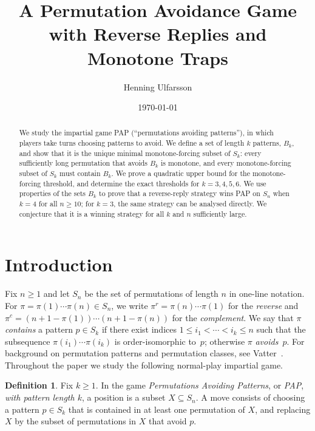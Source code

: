 \documentclass[11pt]{amsart}
\title[Permutation Avoidance Game]{A Permutation Avoidance Game with Reverse Replies and Monotone Traps}
\author{Henning Ulfarsson}
\date{\today}
\newcommand{\Sym}{S}
\theoremstyle{plain}
\theoremstyle{definition}
\newtheorem{definition}[theorem]{Definition}
\theoremstyle{remark}
\begin{document}
\begin{abstract}
  We study the impartial game PAP (``permutations avoiding patterns''), in which players take turns choosing patterns to avoid. We define a set of length $k$ patterns, $B_k$,
  and show that it is the unique minimal
  monotone-forcing subset of $\Sym_k$: every sufficiently long permutation that avoids $B_k$ is
  monotone, and every monotone-forcing subset of $\Sym_k$ must contain $B_k$.  We prove a quadratic upper bound for the
  monotone-forcing threshold, and determine the exact thresholds for $k=3,4,5,6$.  We use properties
  of the sets $B_k$ to prove that a reverse-reply strategy wins PAP on $\Sym_n$ when $k=4$
  for all $n \geq 10$; for $k=3$, the same strategy can be analysed directly.  We conjecture that it is a winning strategy for all $k$ and $n$ sufficiently large.
\end{abstract}

\maketitle

\section{Introduction}

Fix $n \geq 1$ and let $\Sym_n$ be the set of permutations of length $n$ in one-line notation.
For $\pi = \pi(1)\cdots\pi(n) \in \Sym_n$, we write $\pi^r = \pi(n)\cdots\pi(1)$ for the
\emph{reverse} and $\pi^c = (n{+}1{-}\pi(1))\cdots(n{+}1{-}\pi(n))$ for the \emph{complement}.
We say that $\pi$ \emph{contains} a pattern $p \in \Sym_k$ if there exist indices
$1 \leq i_1 < \cdots < i_k \leq n$ such that the subsequence $\pi(i_1)\cdots\pi(i_k)$ is
order-isomorphic to~$p$; otherwise $\pi$ \emph{avoids}~$p$.
For background on permutation patterns and permutation classes, see
Vatter~\cite{vatter-permutation-classes}.
Throughout the paper we study the following normal-play impartial game.

\begin{definition}
  Fix $k \geq 1$.  In the game \emph{Permutations Avoiding Patterns}, or \emph{PAP}, \emph{with pattern length $k$}, a position is a subset
  $X \subseteq \Sym_n$.  A move consists of choosing a pattern $p \in \Sym_k$ that is contained
  in at least one permutation of $X$, and replacing $X$ by the subset of permutations in $X$ that
  avoid $p$.
\end{definition}
\end{document}
